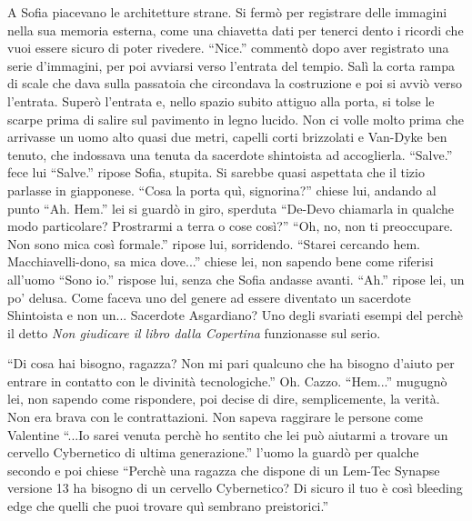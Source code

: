     A Sofia piacevano le architetture strane. Si fermò per registrare delle immagini nella sua memoria esterna, come una
    chiavetta dati per tenerci dento i ricordi che vuoi essere sicuro di poter rivedere. ``Nice.'' commentò dopo aver
    registrato una serie d'immagini, per poi avviarsi verso l'entrata del tempio. Salì la corta rampa di scale che dava
    sulla passatoia che circondava la costruzione e poi si avviò verso l'entrata. Superò l'entrata e, nello spazio
    subito attiguo alla porta, si tolse le scarpe prima di salire sul pavimento in legno lucido. Non ci volle molto
    prima che arrivasse un uomo alto quasi due metri, capelli corti brizzolati e Van-Dyke ben tenuto, che indossava una tenuta da sacerdote shintoista ad accoglierla.
    ``Salve.'' fece lui ``Salve.'' ripose Sofia, stupita. Si sarebbe quasi aspettata che il tizio parlasse in
    giapponese. ``Cosa la porta quì, signorina?'' chiese lui, andando al punto ``Ah. Hem.'' lei si guardò in giro,
    sperduta ``De-Devo chiamarla in qualche modo particolare? Prostrarmi a terra o cose così?'' ``Oh, no, non ti
    preoccupare. Non sono mica così formale.'' ripose lui, sorridendo. ``Starei cercando hem. Macchiavelli-dono, sa mica
    dove...'' chiese lei, non sapendo bene come riferisi all'uomo ``Sono io.'' rispose lui, senza che Sofia andasse
    avanti. ``Ah.'' ripose lei, un po' delusa. Come faceva uno del genere ad essere diventato un sacerdote Shintoista e
    non un... Sacerdote Asgardiano? Uno degli svariati esempi del perchè il detto \emph{Non giudicare il libro dalla
    Copertina} funzionasse sul serio.

    ``Di cosa hai bisogno, ragazza? Non mi pari qualcuno che ha bisogno d'aiuto per entrare in contatto con le divinità
    tecnologiche.'' Oh. Cazzo. ``Hem...'' mugugnò lei, non sapendo come rispondere, poi decise di dire, semplicemente,
    la verità. Non era brava con le contrattazioni. Non sapeva raggirare le persone come Valentine ``...Io sarei venuta
    perchè ho sentito che lei può aiutarmi a trovare un cervello Cybernetico di ultima generazione.'' l'uomo la guardò
    per qualche secondo e poi chiese ``Perchè una ragazza che dispone di un Lem-Tec Synapse versione 13 ha bisogno di un
    cervello Cybernetico? Di sicuro il tuo è così bleeding edge che quelli che puoi trovare quì sembrano preistorici.''

